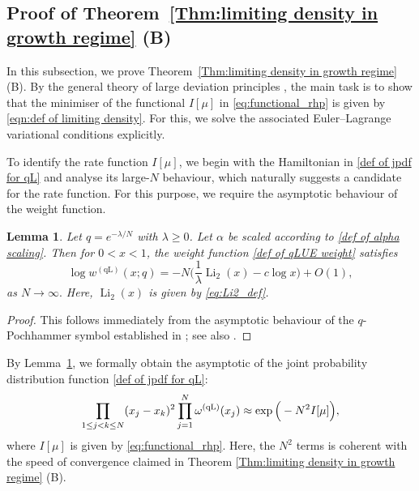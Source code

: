 \documentclass{amsart}
\newcommand{\Li}{\operatorname{Li}}
\theoremstyle{plain}
\newtheorem{lem}[thm]{Lemma}
\theoremstyle{remark}
\numberwithin{equation}{section}
\begin{document}
 













 












\subsection{Proof of Theorem~\ref{Thm:limiting density in growth regime} (B)} \label{Section_Thm B}

In this subsection, we prove Theorem~\ref{Thm:limiting density in growth regime} (B).
By the general theory of large deviation principles \cite{DD22,HMO25}, the main task is to show that the minimiser of the functional $I[\mu]$ in
\eqref{eq:functional_rhp} is given by \eqref{eqn:def of limiting density}.
For this, we solve  the associated Euler--Lagrange variational conditions explicitly.
 

To identify the rate function $I[\mu]$, we begin with the Hamiltonian in \eqref{def of jpdf for qL} and analyse its large-$N$ behaviour, which naturally suggests a candidate for the rate function.
For this purpose, we require the asymptotic behaviour of the weight function.
 

\begin{lem} \label{Lem_asymp of weight}
Let $q=e^{-\lambda/N}$ with $\lambda \ge 0$. Let $\alpha$ be scaled according to \eqref{def of alpha scaling}. Then for $0<x<1$, the weight function \eqref{def of qLUE weight} satisfies 
\begin{equation}
\log  w^{(\mathrm{qL})}(x;q) = -N \Big( \frac{1}{\lambda} \Li_2(x) -c \log x \Big)+O(1),
\end{equation}
as $N \to \infty.$ Here,  $\Li_2(x)$ is given by \eqref{eq:Li2_def}. 
\end{lem}
\begin{proof}
This follows immediately from the asymptotic behaviour of the $q$-Pochhammer symbol established in \cite[Theorem~4]{Mc99}; see also \cite[Lemma~4.1]{FKP24}.   
\end{proof}
  

By Lemma~\ref{Lem_asymp of weight}, we formally obtain the asymptotic of the joint probability distribution function \eqref{def of jpdf for qL}: 
\begin{equation}
 \prod_{1\le j<k \le N}(x_j-x_k)^2 \prod_{j=1}^N \omega^{\rm (qL)}(x_j)  \approx \exp \Big( -N^2 I[\mu] \Big), 
\end{equation}
where $I[\mu]$ is given by \eqref{eq:functional_rhp}. Here, the $N^2$ terms is coherent with the speed of convergence claimed in Theorem \ref{Thm:limiting density in growth regime} (B). 
 
\end{document}
